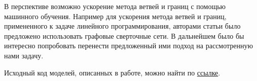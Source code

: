 \documentclass[12pt]{article}
\begin{document}
В перспективе возможно ускорение метода ветвей и границ с помощью машинного обучения. Например для ускорения метода ветвей и границ, примененного к задаче линейного программирования, авторами статьи \cite{https://doi.org/10.48550/arxiv.2012.13349} было предложено использовать графовые сверточные сети. В дальнейшем было бы интересно попробовать перенести предложенный ими подход на рассмотренную нами задачу.

Исходный код моделей, описанных в работе, можно найти по \href{https://github.com/antony-frolov/ICOptimization}{ссылке}.



\end{document}
